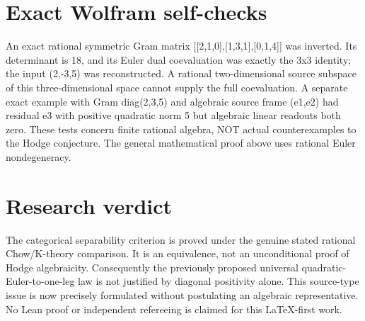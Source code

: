 \documentclass{article}
\begin{document}
\section*{Exact Wolfram self-checks}
An exact rational symmetric Gram matrix
[[2,1,0],[1,3,1],[0,1,4]]
was inverted. Its determinant is 18,
and its Euler dual coevaluation was
exactly the 3x3 identity; the input
(2,-3,5) was reconstructed. A rational
two-dimensional source subspace of this
three-dimensional space cannot supply
the full coevaluation. A separate exact
example with Gram diag(2,3,5) and
algebraic source frame (e1,e2)
had residual e3 with positive quadratic
norm 5 but algebraic linear readouts
both zero. These tests concern
finite rational algebra, NOT actual
counterexamples to the Hodge conjecture.
The general mathematical proof above
uses rational Euler nondegeneracy.

\section*{Research verdict}
The categorical separability criterion
is proved under the genuine stated
rational Chow/K-theory comparison.
It is an equivalence, not an unconditional
proof of Hodge algebraicity. Consequently
the previously proposed universal
quadratic-Euler-to-one-leg law is
not justified by diagonal positivity
alone. This source-type issue is
now precisely formulated without
postulating an algebraic representative.
No Lean proof or independent refereeing
is claimed for this LaTeX-first work.
\end{document}
